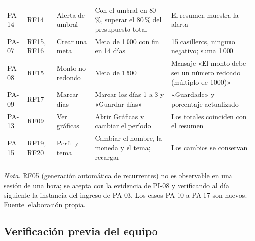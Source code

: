 {\begin{longtable}{L{1.1cm} L{1.3cm} L{3.2cm} L{4.6cm} L{3.2cm}}
PA-14 & RF14 & Alerta de umbral & Con el umbral en 80\,\%, superar el 80\,\% del presupuesto total & El resumen muestra la alerta \\
PA-07 & RF15, RF16 & Crear una meta & Meta de 1\,000 con fin en 14 días & 15 casilleros, ninguno negativo; suma 1\,000 \\
PA-08 & RF15 & Monto no redondo & Meta de 1\,500 & Mensaje «El monto debe ser un número redondo (múltiplo de 1000)» \\
PA-09 & RF17 & Marcar días & Marcar los días 1 a 3 y «Guardar días» & «Guardado» y porcentaje actualizado \\
PA-13 & RF09 & Ver gráficas & Abrir Gráficas y cambiar el período & Los totales coinciden con el resumen \\
PA-15 & RF19, RF20 & Perfil y tema & Cambiar el nombre, la moneda y el tema; recargar & Los cambios se conservan \\
\end{longtable}
}
\vspace{-1em}
{\small\textit{Nota.} RF05 (generación automática de recurrentes) no es observable en una sesión de una hora; se acepta con la evidencia de PI-08 y verificando al día siguiente la instancia del ingreso de PA-03. Los casos PA-10 a PA-17 son nuevos. Fuente: elaboración propia.}

\subsection{Verificación previa del equipo}

